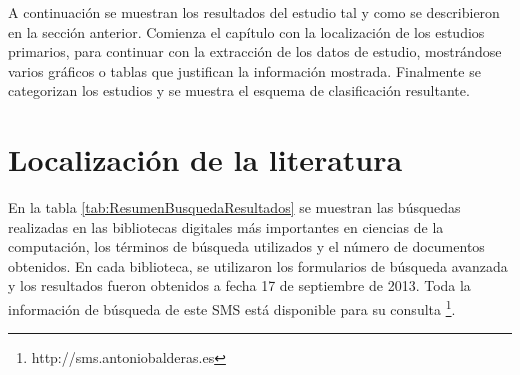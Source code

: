 


A continuación se muestran los resultados del estudio tal y como se describieron en la sección anterior. Comienza el capítulo con la localización de los estudios primarios, para continuar con la extracción de los datos de estudio, mostrándose varios gráficos o tablas que justifican la información mostrada. Finalmente se categorizan los estudios y se muestra el esquema de clasificación resultante.

\section{Localización de la literatura}
En la tabla \ref{tab:ResumenBusquedaResultados} se muestran las búsquedas realizadas en las bibliotecas digitales más importantes en ciencias de la computación, los términos de búsqueda utilizados y el número de documentos obtenidos. En cada biblioteca, se utilizaron los formularios de búsqueda avanzada y los resultados fueron obtenidos a fecha 17 de septiembre de 2013. Toda la información de búsqueda de este SMS está disponible para su consulta \footnote{http://sms.antoniobalderas.es}.



